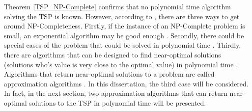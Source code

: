 \documentclass[12pt]{article}
\numberwithin{equation}{subsection}
\numberwithin{table}{subsection}
\numberwithin{algorithm}{subsection}
\begin{document}
Theorem \ref{TSP_NP-Complete} confirms that no polynomial time algorithm solving the TSP is known. However, according to \cite{cormen_leiserson_rivest_stein}, there are three ways to get around NP-Completeness. Firstly, if the instance of an NP-Complete problem is small, an exponential algorithm may be good enough \cite{cormen_leiserson_rivest_stein}. Secondly, there could be special cases of the problem that could be solved in polynomial time \cite{cormen_leiserson_rivest_stein}. Thirdly, there are algorithms that can be designed to find near-optimal solutions (solutions who's value is very close to the optimal value) in polynomial time \cite{cormen_leiserson_rivest_stein}. Algorithms that return near-optimal solutions to a problem are called approximation algorithms \cite{cormen_leiserson_rivest_stein}. In this dissertation, the third case will be considered. In fact, in the next section, two approximation algorithms that can return near-optimal solutions to the TSP in polynomial time will be presented.
\end{document}
